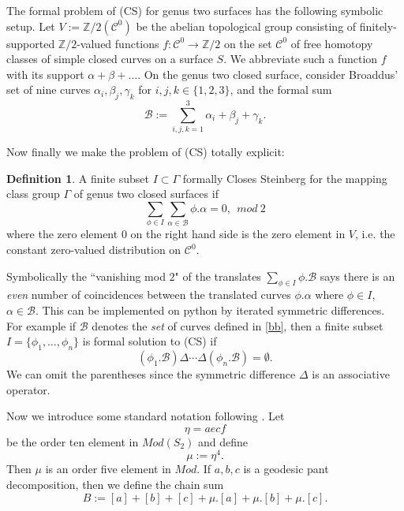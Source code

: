 \documentclass[12pt]{amsart}
\theoremstyle{definition}
\newtheorem{dfn}[thm]{Definition}
\theoremstyle{remark}
\newcommand{\bZ}{\mathbb{Z}}
\newcommand{\sB}{\mathscr{B}}
\newcommand{\sC}{\mathscr{C}}
\begin{document}


The formal problem of (CS) for genus two surfaces has the following symbolic setup. Let $V:=\bZ/2(\sC^0)$ be the abelian topological group consisting of finitely-supported $\bZ/2$-valued functions $f: \sC^0 \to \bZ/2$ on the set $\sC^0$ of free homotopy classes of simple closed curves on a surface $S$. We abbreviate such a function $f$ with its support $\alpha+\beta+\ldots$. On the genus two closed surface, consider Broaddus' set of nine curves $\alpha_i, \beta_j, \gamma_k$ for $i,j,k \in \{1,2,3\}$, and the formal sum 
\begin{equation}\label{bb}
\sB:= \sum_{i,j,k=1}^{3} \alpha_i+\beta_j+\gamma_k.
\end{equation}

Now finally we make the problem of (CS) totally explicit: 
\begin{dfn}
A finite subset $I\subset \Gamma$ formally Closes Steinberg for the mapping class group $\Gamma$ of genus two closed surfaces if 
\begin{equation}
\label{bb}
\sum_{\phi\in I} \sum_{\alpha\in \sB}\phi.\alpha=0, ~~mod~2
\end{equation}
where the zero element $0$ on the right hand side is the zero element in $V$, i.e. the constant zero-valued distribution on $\sC^0$. 
\end{dfn}

Symbolically the ``vanishing mod $2$" of the translates $\sum_{\phi\in I} \phi.\sB$ says there is an \emph{even} number of coincidences between the translated curves $\phi.\alpha$ where $\phi\in I$, $\alpha\in \sB$. This can be implemented on python by iterated symmetric differences. For example if $\sB$ denotes the \emph{set} of curves defined in \eqref{bb}, then a finite subset $I=\{\phi_1, \ldots, \phi_n\}$ is formal solution to (CS) if $$(\phi_1. \sB) \Delta \cdots \Delta (\phi_n.\sB) = \emptyset.$$ We can omit the parentheses since the symmetric difference $\Delta$ is an associative operator.

Now we introduce some standard notation following \cite{nakamura2018generation}. Let $$\eta=aecf$$ be the order ten element in $Mod(S_2)$ and define $$\mu:=\eta^4.$$ Then $\mu$ is an order five element in $Mod$. If $a,b,c$ is a geodesic pant decomposition, then we define the chain sum $$B:=[a]+[b]+[c]+\mu.[a]+\mu.[b]+\mu.[c].$$
\end{document}
